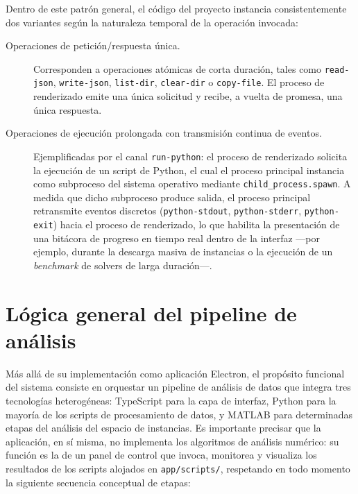 Dentro de este patr\'on general, el c\'odigo del proyecto instancia
consistentemente dos variantes seg\'un la naturaleza temporal de la
operaci\'on invocada:

\begin{description}
    \item[Operaciones de petici\'on/respuesta \'unica.] Corresponden a
    operaciones at\'omicas de corta duraci\'on, tales como
    \texttt{read-json}, \texttt{write-json}, \texttt{list-dir},
    \texttt{clear-dir} o \texttt{copy-file}. El proceso de renderizado emite
    una \'unica solicitud y recibe, a vuelta de promesa, una \'unica
    respuesta.

    \item[Operaciones de ejecuci\'on prolongada con transmisi\'on continua de
    eventos.] Ejemplificadas por el canal \texttt{run-python}: el proceso de
    renderizado solicita la ejecuci\'on de un script de Python, el cual el
    proceso principal instancia como subproceso del sistema operativo
    mediante \texttt{child\_process.spawn}. A medida que dicho subproceso
    produce salida, el proceso principal retransmite eventos discretos
    (\texttt{python-stdout}, \texttt{python-stderr}, \texttt{python-exit})
    hacia el proceso de renderizado, lo que habilita la presentaci\'on de una
    bit\'acora de progreso en tiempo real dentro de la interfaz —por
    ejemplo, durante la descarga masiva de instancias o la ejecuci\'on de un
    \emph{benchmark} de solvers de larga duraci\'on—.
\end{description}

\section{L\'ogica general del pipeline de an\'alisis}

M\'as all\'a de su implementaci\'on como aplicaci\'on Electron, el
prop\'osito funcional del sistema consiste en orquestar un pipeline de
an\'alisis de datos que integra tres tecnolog\'ias heterog\'eneas:
TypeScript para la capa de interfaz, Python para la mayor\'ia de los scripts
de procesamiento de datos, y MATLAB para determinadas etapas del an\'alisis
del espacio de instancias. Es importante precisar que la aplicaci\'on, en
s\'i misma, no implementa los algoritmos de an\'alisis num\'erico: su
funci\'on es la de un panel de control que invoca, monitorea y visualiza los
resultados de los scripts alojados en \texttt{app/scripts/}, respetando en
todo momento la siguiente secuencia conceptual de etapas:

